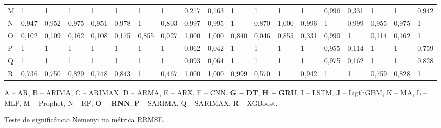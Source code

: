 \begin{landscape}
\begin{table}[!htb]
\begin{tabular}{@{}lllllllllllllllllll@{}}
M      & 1     & 1     & 1     & 1     & 1     & 1     & 1     & 0,217 & 0,163 & 1     & 1     & 1     & 1     & 0,996 & 0,331 & 1     & 1     & 0,942 \\
N      & 0,947 & 0,952 & 0,975 & 0,951 & 0,978 & 1     & 0,803 & 0,997 & 0,995 & 1     & 0,870 & 1,000 & 0,996 & 1     & 0,999 & 0,955 & 0,975 & 1     \\
O      & 0,102 & 0,109 & 0,162 & 0,108 & 0,175 & 0,855 & 0,027 & 1,000 & 1,000 & 0,840 & 0,046 & 0,855 & 0,331 & 0,999 & 1     & 0,114 & 0,162 & 1     \\
P      & 1     & 1     & 1     & 1     & 1     & 1     & 1     & 0,062 & 0,042 & 1     & 1     & 1     & 1     & 0,955 & 0,114 & 1     & 1     & 0,759 \\
Q      & 1     & 1     & 1     & 1     & 1     & 1     & 1     & 0,093 & 0,064 & 1     & 1     & 1     & 1     & 0,975 & 0,162 & 1     & 1     & 0,828 \\
R      & 0,736 & 0,750 & 0,829 & 0,748 & 0,843 & 1     & 0,467 & 1,000 & 1,000 & 0,999 & 0,570 & 1     & 0,942 & 1     & 1     & 0,759 & 0,828 & 1     \\ \bottomrule
\end{tabular}
	\vspace{2mm}
	
	\captionsetup{justification=centering} %
	A -- AR,
	B -- ARIMA,
	C -- ARIMAX,
	D -- ARMA,
	E -- ARX,
	F -- CNN,
	\textbf{G -- DT},
	\textbf{H -- GRU},
	I -- LSTM,
	J -- LigthGBM,
	K -- MA,
	L -- MLP,
	M -- Prophet,
	N -- RF,
	\textbf{O -- RNN},
	P -- SARIMA,
	Q -- SARIMAX,
	R -- XGBoost.
	
\end{table}

	\begin{table}[!htb]
	\caption{Teste de significância Nemenyi na métrica RRMSE.}\label{tb:nemenyi2}
	\centering


\end{table}
\end{landscape}
